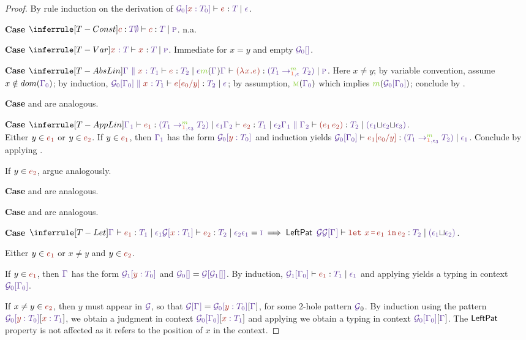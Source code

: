 \documentclass{article}
\begin{document}
\begin{proof}
  By rule induction on the derivation of  $\HasType
  {\CtxPattern[0]{\CtxVar x{\T[0]}}} {\E} {\T} {\Eff}$.

  \textbf{Case} $\RuleTConst$. n.a.

  \textbf{Case} $\RuleTVar$. Immediate for $x=y$ and empty $\CtxPattern[0]{}$.

  \textbf{Case} $\RuleTAbsLin$. Here $x\ne y$; by variable convention, assume
  $x \notin dom (\Ctx[0])$; by induction,
  $\HasType
  {\CtxExtUnord{\CtxPattern[0]{{\Ctx[0]}}}{\CtxVar\EVar{\T[1]}}}
  {\Subs\E{\E[0]} y} {\T[2]} {\Eff}$; by assumption, $\MobMobile
  (\Ctx[0])$ which implies $\Mob (\CtxPattern[0]{{\Ctx[0]}})$; conclude
  by .

  \textbf{Case}  and  are
  analogous.

  \textbf{Case} $\RuleTAppLin$. \\
  Either $y\in \E[1]$ or $y \in \E[2]$.
  If $y\in \E[1]$, then $\Ctx[1]$ has the form $\CtxPattern[0]{\CtxVar y
    {\T[0]}}$ and induction yields
  $\HasType {\CtxPattern[0]{\Ctx[0]}} {\Subs{\E[1]}{\E[0]}y}
  {(\TArr{\Mob}{\DirUnord,{\Eff[3]}}{\T[1]}{\T[2]})}
  {\Eff[1]}$. Conclude by applying . 

  If $y\in \E[2]$, argue analogously.

  \textbf{Case}  and  are
  analogous.

  \textbf{Case}  and  are analogous.

  \textbf{Case} $\RuleTLet$.

  Either $y\in\E[1]$ or $x\ne y$ and $y\in\E[2]$.

  If $y\in\E[1]$, then $\Ctx$ has the form $\CtxPattern[1]{\CtxVar y
    {\T[0]}}$ and $\CtxPattern[0]{} = \CtxPattern{\CtxPattern[1]{}}$.
  By induction, $\HasType {\CtxPattern[1]{\Ctx[0]}} {\E[1]} {\T[1]}
  {\Eff[1]}$ and applying  yields a typing in context
  $\CtxPattern[0]{\Ctx[0]}$.

  If $x \ne y \in \E[2]$, then $y$ must appear in $\CtxPatternRaw$, so
  that $\CtxPattern{\Ctx} = \CtxPattern[0]{\CtxVar y {\T[0]}}[{\Ctx}]$, for
  some 2-hole pattern $\CtxPatternRaw_0$. By induction using the
  pattern $\CtxPattern[0]{\CtxVar y {\T[0]}}[{\CtxVar x {\T[1]}}]$, we
  obtain a judgment in context $\CtxPattern[0]{\Ctx[0]}[{\CtxVar x {\T[1]}}]$
 and applying 
  we obtain a typing in context $\CtxPattern[0]{\Ctx[0]}[{\Ctx}]$. The
  $\operatorname{\textsf{LeftPat}}$ property is not affected as it refers to the position
  of $x$ in the context.


\end{proof}
\end{document}
